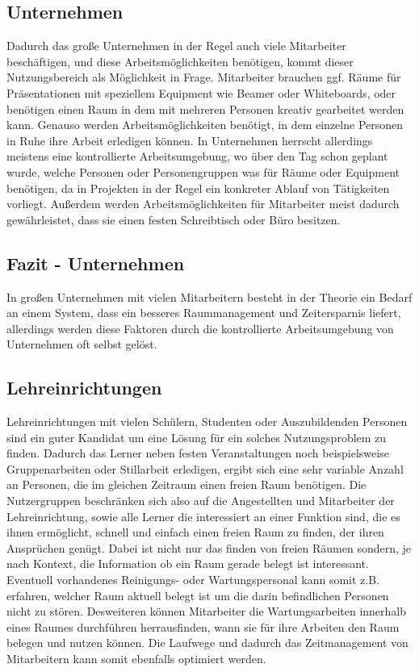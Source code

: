 \subsection{Unternehmen}
\label{sec:Unternehmen}

Dadurch das große Unternehmen in der Regel auch viele Mitarbeiter beschäftigen,
und diese Arbeitsmöglichkeiten benötigen, kommt dieser Nutzungsbereich als
Möglichkeit in Frage. Mitarbeiter brauchen ggf. Räume für Präsentationen mit
speziellem Equipment wie Beamer oder Whiteboards, oder benötigen einen Raum in
dem mit mehreren Personen kreativ gearbeitet werden kann. Genauso werden
Arbeitsmöglichkeiten benötigt, in dem einzelne Personen in Ruhe ihre Arbeit
erledigen können. In Unternehmen herrscht allerdings meistens eine
kontrollierte Arbeitsumgebung, wo über den Tag schon geplant wurde, welche
Personen oder Personengruppen was für Räume oder Equipment benötigen, da in
Projekten in der Regel ein konkreter Ablauf von Tätigkeiten vorliegt. Außerdem
werden Arbeitsmöglichkeiten für Mitarbeiter meist dadurch gewährleistet, dass
sie einen festen Schreibtisch oder Büro besitzen.

\subsection{Fazit - Unternehmen}
\label{sec:Fazit - Unternehmen}

In großen Unternehmen mit vielen Mitarbeitern besteht in der Theorie ein Bedarf
an einem System, dass ein besseres Raummanagement und Zeitersparnis liefert,
allerdings werden diese Faktoren durch die kontrollierte Arbeitsumgebung von
Unternehmen oft selbst gelöst.

\subsection{Lehreinrichtungen}
\label{sec:Lehreinrichtungen}

Lehreinrichtungen mit vielen Schülern, Studenten oder Auszubildenden Personen
sind ein guter Kandidat um eine Lösung für ein solches Nutzungsproblem zu
finden. Dadurch das Lerner neben festen Veranstaltungen noch beispielsweise
Gruppenarbeiten oder Stillarbeit erledigen, ergibt sich eine sehr variable
Anzahl an Personen, die im gleichen Zeitraum einen freien Raum benötigen.
Die Nutzergruppen beschränken sich also auf die Angestellten und Mitarbeiter
der Lehreinrichtung, sowie alle Lerner die interessiert an einer Funktion sind,
die es ihnen ermöglicht, schnell und einfach einen freien Raum zu finden, der
ihren Ansprüchen genügt.
Dabei ist nicht nur das finden von freien Räumen sondern, je nach Kontext, die
Information ob ein Raum gerade belegt ist interessant. Eventuell vorhandenes
Reinigungs- oder Wartungspersonal kann somit z.B. erfahren, welcher Raum
aktuell belegt ist um die darin befindlichen Personen nicht zu stören.
Desweiteren können Mitarbeiter die Wartungsarbeiten innerhalb eines Raumes
durchführen herrausfinden, wann sie für ihre Arbeiten den Raum belegen und
nutzen können. Die Laufwege und dadurch das Zeitmanagement von Mitarbeitern
kann somit ebenfalls optimiert werden.

